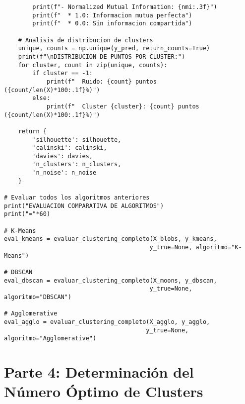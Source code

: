 \documentclass[12pt]{article}
\begin{document}
\begin{lstlisting}
        print(f"- Normalized Mutual Information: {nmi:.3f}")
        print(f"  * 1.0: Informacion mutua perfecta")
        print(f"  * 0.0: Sin informacion compartida")
    
    # Analisis de distribucion de clusters
    unique, counts = np.unique(y_pred, return_counts=True)
    print(f"\nDISTRIBUCION DE PUNTOS POR CLUSTER:")
    for cluster, count in zip(unique, counts):
        if cluster == -1:
            print(f"  Ruido: {count} puntos ({count/len(X)*100:.1f}%)")
        else:
            print(f"  Cluster {cluster}: {count} puntos ({count/len(X)*100:.1f}%)")
    
    return {
        'silhouette': silhouette,
        'calinski': calinski,
        'davies': davies,
        'n_clusters': n_clusters,
        'n_noise': n_noise
    }

# Evaluar todos los algoritmos anteriores
print("EVALUACION COMPARATIVA DE ALGORITMOS")
print("="*60)

# K-Means
eval_kmeans = evaluar_clustering_completo(X_blobs, y_kmeans, 
                                         y_true=None, algoritmo="K-Means")

# DBSCAN  
eval_dbscan = evaluar_clustering_completo(X_moons, y_dbscan,
                                         y_true=None, algoritmo="DBSCAN")

# Agglomerative
eval_agglo = evaluar_clustering_completo(X_agglo, y_agglo,
                                        y_true=None, algoritmo="Agglomerative")
\end{lstlisting}

\section{Parte 4: Determinación del Número Óptimo de Clusters}
\end{document}
